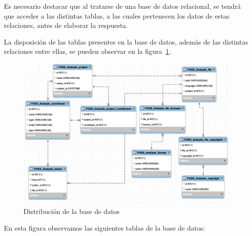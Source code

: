 \documentclass[a4paper, spanish, 12pt]{book}
\begin{document}
Es necesario destacar que al tratarse de una base de datos relacional, se tendr\'a
que acceder a las distintas tablas, a las cuales pertenecen los datos de estas
relaciones, antes de elaborar la respuesta.

La disposici\'on de las tablas presentes en la base de datos, adem\'as de las
distintas relaciones entre ellas, se pueden observar en la figura~\ref{fig:database}.

\begin{figure}
  \centering
  \includegraphics[width=14cm, keepaspectratio]{img/mysql_tables}
  \caption{Distribuci\'on de la base de datos}
  \label{fig:database}
\end{figure}

En esta figura observamos las siguientes tablas de la base de datos:
\end{document}
